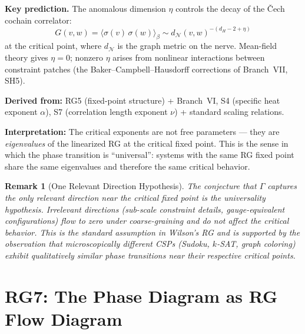 \documentclass[11pt,letterpaper]{article}
\newtheorem{remark}[conjecture]{Remark}
\newcommand{\nerve}{\mathcal{N}}
\begin{document}
\textbf{Key prediction.} The anomalous dimension $\eta$ controls 
the decay of the \v{C}ech cochain correlator:
\begin{equation}\label{eq:anomalous_decay}
    G(v, w) = \langle \sigma(v) \, \sigma(w) \rangle_\beta 
    \sim d_\nerve(v, w)^{-(d_H - 2 + \eta)}
\end{equation}
at the critical point, where $d_\nerve$ is the graph metric on the 
nerve. Mean-field theory gives $\eta = 0$; nonzero $\eta$ arises 
from nonlinear interactions between constraint patches (the 
Baker--Campbell--Hausdorff corrections of Branch~VII, SH5).

\textbf{Derived from:} RG5 (fixed-point structure) + Branch~VI, S4 
(specific heat exponent $\alpha$), S7 (correlation length exponent 
$\nu$) + standard scaling relations.

\textbf{Interpretation:} The critical exponents are not free 
parameters --- they are \emph{eigenvalues} of the linearized RG at 
the critical fixed point. This is the sense in which the phase 
transition is ``universal'': systems with the same RG fixed point 
share the same eigenvalues and therefore the same critical behavior.

\begin{remark}[One Relevant Direction 
Hypothesis]\label{rem:one_relevant}
The conjecture that $\Gamma$ captures the \emph{only} relevant 
direction near the critical fixed point is the universality 
hypothesis. Irrelevant directions (sub-scale constraint details, 
gauge-equivalent configurations) flow to zero under 
coarse-graining and do not affect the critical behavior. This is 
the standard assumption in Wilson's RG and is supported by the 
observation that microscopically different CSPs (Sudoku, $k$-SAT, 
graph coloring) exhibit qualitatively similar phase transitions 
near their respective critical points.
\end{remark}

\section{RG7: The Phase Diagram as RG Flow Diagram}
\end{document}
